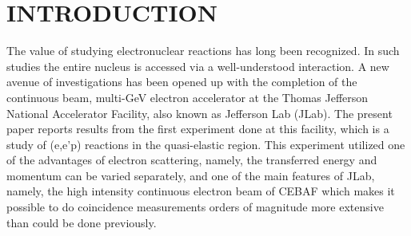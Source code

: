 \documentclass[aps,prl,twocolumn,showpacs,amsmath,amssymb,floats]{revtex4}
\begin{document}
\begin{abstract}
We report the results from a systematic study of the quasi-elastic (e,e'p) 
reaction on $^{12}$C, $^{56}$Fe and $^{197}$Au performed at Jefferson Lab. We
 have measured nuclear transparency and extracted spectral functions (corrected for 
radiation) over a Q$^2$ range of 0.64 - 3.25 (GeV/c)$^2$ for all three nuclei. 
In addition we have extracted separated longitudinal and transverse spectral 
functions at Q$^2$ of 0.64 and 1.8 (GeV/c)$^2$ for these three 
nuclei (except for  $^{197}$Au at the higher Q$^2$). The spectral functions 
are compared to a number of theoretical calculations. The measured spectral 
functions differ in detail but not in overall shape from most of the theoretical 
models. In all three targets the measured spectral functions show considerable 
excess transverse strength at Q$^2$ = 0.64 (GeV/c)$^2$, which is much reduced 
at 1.8 (GeV/c)$^2$.
\end{abstract}
\maketitle

\section*{INTRODUCTION}
The value of studying electronuclear reactions has long been recognized.  In 
such studies the entire nucleus is accessed via a well-understood interaction.  
A new avenue of investigations has been opened up with the completion of the 
continuous beam, multi-GeV electron accelerator at the Thomas Jefferson National 
Accelerator Facility, also known as Jefferson Lab (JLab). The present paper 
reports results from the first experiment done at this facility, which is a study 
of (e,e'p) reactions in the quasi-elastic region.  This experiment utilized one 
of the advantages of electron scattering, namely, the transferred energy and 
momentum can be varied separately, and one of the main features of JLab, namely, 
the high intensity continuous electron beam of CEBAF which makes it possible to 
do coincidence measurements orders of magnitude more extensive than could be 
done previously.  
\end{document}
